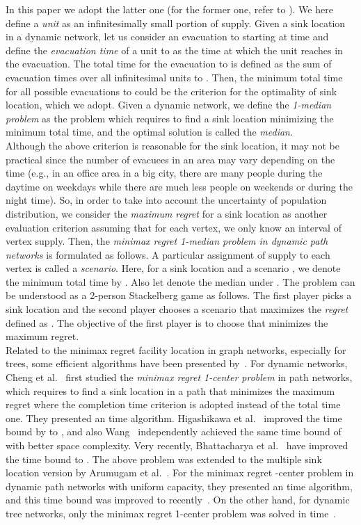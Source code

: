 \documentclass[a4paper]{llncs}
\begin{document}
In this paper we adopt the latter one (for the former one, refer to \cite{h14,hgk14_2,hgk14_4,mumf06}).
We here define a {\it unit} as an infinitesimally small portion of supply.
Given a sink location  in a dynamic network, let us consider an evacuation to  starting at time  
and define the {\it evacuation time} of a unit to  as the time at which the unit reaches  in the evacuation.
The total time for the evacuation to  is defined as the sum of evacuation times over all infinitesimal units to .
Then, the minimum total time for all possible evacuations to  could be the criterion for the optimality of sink location, which we adopt.
Given a dynamic network, we define the {\it 1-median problem} as the problem which requires to find a sink location minimizing the minimum total time, 
and the optimal solution is called the {\it median}.\\
\indent
Although the above criterion is reasonable for the sink location, it may not be practical since the number of evacuees in an area may vary depending on the time
(e.g., in an office area in a big city, there are many people during the daytime on weekdays while there are much less people on weekends or during the night time). 
So, in order to take into account the uncertainty of population distribution,
we consider the {\it maximum regret} for a sink location as another evaluation criterion assuming that for each vertex, we only know an interval of vertex supply. 
Then, the {\it minimax regret 1-median problem in dynamic path networks} is formulated as follows.
A particular assignment of supply to each vertex is called a {\it scenario}.
Here, for a sink location  and a scenario , we denote the minimum total time by .
Also let  denote the median under .
The problem can be understood as a 2-person Stackelberg game as follows.
The first player picks a sink location  and the second player chooses a scenario  that maximizes the {\it regret} defined as .
The objective of the first player is to choose  that minimizes the maximum regret. \\
\indent
Related to the minimax regret facility location in graph networks, especially for trees, some efficient algorithms have been presented by~\cite{ab00,bk12,bks13,bgk08,cl98,c08}.
For dynamic networks, Cheng et al.~\cite{chknsx13} first studied the
{\it minimax regret 1-center problem} in path networks,
which requires to find a sink location in a path that minimizes the maximum regret where the completion time criterion is adopted instead of the total time one.
They presented an  time algorithm.
Higashikawa et al.~\cite{hacknsx14} improved the time bound by \cite{chknsx13} to , and also Wang~\cite{w13} independently achieved the same time bound of  with better space complexity.
Very recently, Bhattacharya et al.~\cite{bk14} have improved the time bound to .
The above problem was extended to the multiple sink location version by Arumugam et al.~\cite{aags14}.
For the minimax regret -center problem in dynamic path networks with uniform capacity, they presented an  time algorithm, and this time bound was improved to  recently~\cite{h14}.
On the other hand, for dynamic tree networks, only the minimax regret 1-center problem was solved in  time~\cite{hgk14,hgk14_3}.
\end{document}

